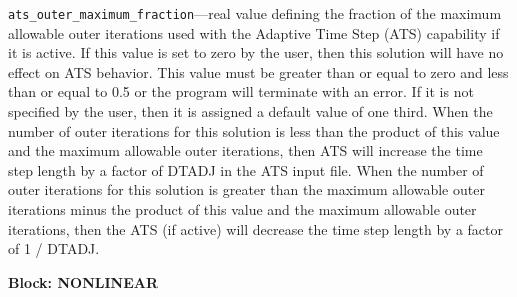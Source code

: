 \begin{description}
\item \texttt{ats\_outer\_maximum\_fraction}---real value defining the fraction of the maximum allowable outer iterations used with the Adaptive Time Step (ATS) capability if it is active.  If this value is set to zero by the user, then this solution will have no effect on ATS behavior.  This value must be greater than or equal to zero and less than or equal to 0.5 or the program will terminate with an error.  If it is not specified by the user, then it is assigned a default value of one third.  When the number of outer iterations for this solution is less than the product of this value and the maximum allowable outer iterations, then ATS will increase the time step length by a factor of DTADJ in the ATS input file.  When the number of outer iterations for this solution is greater than the maximum allowable outer iterations minus the product of this value and the maximum allowable outer iterations, then the ATS (if active) will decrease the time step length by a factor of 1 / DTADJ.

\end{description}
\item \textbf{Block: NONLINEAR}

